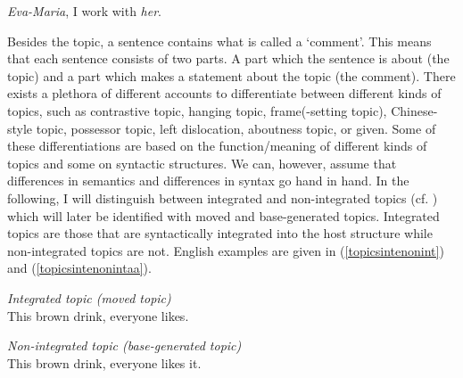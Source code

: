 \begin{exe}
\ex \textit{Eva-Maria}, I work with \textit{her}. \label{ex:topicintro}
\end{exe}

\noindent Besides the topic, a sentence contains what is called a `comment'. This means that each sentence consists of two parts. A part which the sentence is about (the topic) and a part which makes a statement about the topic (the comment). There exists a plethora of different accounts to differentiate between different kinds of topics, such as contrastive topic, hanging topic, frame(-setting topic), Chinese-style topic, possessor topic, left dislocation, aboutness topic, or given. Some of these differentiations are based on the function/meaning of different kinds of topics and some on syntactic structures. We can, however, assume that differences in semantics and differences in syntax go hand in hand. In the following, I will distinguish between integrated and non-integrated topics (cf. \citealt{shaer2004integrated}) which will later be identified with moved and base-generated topics. Integrated topics are those that are syntactically integrated into the host structure while non-integrated topics are not. English examples are given in (\ref{topicsintenonint}) and (\ref{topicsintenonintaa}).

\begin{exe}
\ex \textit{Integrated topic (moved topic)}\\
This brown drink, everyone likes.   \label{topicsintenonint}
\end{exe}

\begin{exe}
\ex \textit{Non-integrated topic (base-generated topic)}\\
This brown drink, everyone likes it. \label{topicsintenonintaa}
\end{exe}

